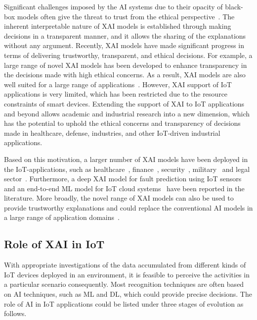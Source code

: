 \documentclass[journal]{IEEEtran}
\begin{document}
Significant challenges imposed by the AI systems due to their opacity of black-box models often give the threat to trust from the ethical perspective~\cite{jacovi2021formalizing}. The inherent interpretable nature of XAI models is established through making decisions in a transparent manner, and it allows the sharing of the explanations without any argument. Recently, XAI models have made significant progress in terms of delivering trustworthy, transparent, and ethical decisions. For example, a large range of novel XAI models has been developed to enhance transparency in the decisions made with high ethical concerns. As a result, XAI models are also well suited for a large range of applications~\cite{gunning2019darpa}. However, XAI support of IoT applications is very limited, which has been restricted due to the resource constraints of smart devices. Extending the support of XAI to IoT applications and beyond allows academic and industrial research into a new dimension, which has the potential to uphold the ethical concerns and transparency of decisions made in healthcare, defense, industries, and other IoT-driven industrial applications.

Based on this motivation, a larger number of XAI models have been deployed in the IoT-applications, such as healthcare~\cite{nazar2021systematic}, finance~\cite{kute2021deep}, security~\cite{zolanvari2021trust}, military~\cite{warren2020friend} and legal sector~\cite{deeks2019judicial}. Furthermore, a deep XAI model for fault prediction using IoT sensors~\cite{mansouri2022deep} and an end-to-end ML model for IoT cloud systems~\cite{nguyen2021holistic} have been reported in the literature. More broadly, the novel range of XAI models can also be used to provide trustworthy explanations and could replace the conventional AI models in a large range of application domains~\cite{jagatheesaperumal2021duo}.



\subsection{Role of XAI in IoT}
With appropriate investigations of the data accumulated from different kinds of IoT devices deployed in an environment, it is feasible to perceive the activities in a particular scenario consequently. Most recognition techniques are often based on AI techniques, such as ML and DL, which could provide precise decisions. The role of AI in IoT applications could be listed under three stages of evolution as follows.
\end{document}
